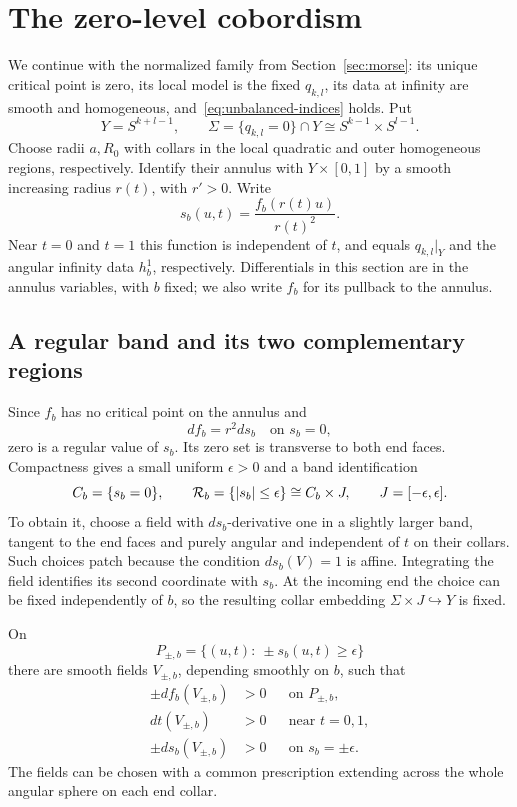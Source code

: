 \section{The zero-level cobordism}\label{sec:obstruction}

We continue with the normalized family from Section~\ref{sec:morse}: its unique critical point is zero, its local model is the fixed $q_{k,l}$, its data at infinity are smooth and homogeneous, and~\eqref{eq:unbalanced-indices} holds. Put
\[
 Y=S^{k+l-1},\qquad
 \Sigma=\{q_{k,l}=0\}\cap Y\cong S^{k-1}\times S^{l-1}.
\]
Choose radii $a,R_0$ with collars in the local quadratic and outer homogeneous regions, respectively. Identify their annulus with $Y\times[0,1]$ by a smooth increasing radius $r(t)$, with $r'>0$. Write
\[
 s_b(u,t)=\frac{f_b(r(t)u)}{r(t)^2}.
\]
Near $t=0$ and $t=1$ this function is independent of $t$, and equals $q_{k,l}|_Y$ and the angular infinity data $h_b^1$, respectively. Differentials in this section are in the annulus variables, with $b$ fixed; we also write $f_b$ for its pullback to the annulus.

\subsection{A regular band and its two complementary regions}

Since $f_b$ has no critical point on the annulus and
\begin{equation}\label{eq:zero-level-differential}
 df_b=r^2ds_b\quad\text{on }s_b=0,
\end{equation}
zero is a regular value of $s_b$. Its zero set is transverse to both end faces. Compactness gives a small uniform $\epsilon>0$ and a band identification
\begin{equation}\label{eq:zero-band}
 C_b=\{s_b=0\},\qquad
 \mathcal R_b=\{\lvert s_b\rvert\leq\epsilon\}\cong C_b\times J,
 \qquad J=[-\epsilon,\epsilon].
\end{equation}
To obtain it, choose a field with $ds_b$-derivative one in a slightly larger band, tangent to the end faces and purely angular and independent of $t$ on their collars. Such choices patch because the condition $ds_b(V)=1$ is affine. Integrating the field identifies its second coordinate with $s_b$. At the incoming end the choice can be fixed independently of $b$, so the resulting collar embedding $\Sigma\times J\hookrightarrow Y$ is fixed.

\begin{lemma}\label{lem:signed-flows}
On
\[
 P_{\pm,b}=\{(u,t):\ \pm s_b(u,t)\geq\epsilon\}
\]
there are smooth fields $V_{\pm,b}$, depending smoothly on $b$, such that
\begin{align}
 \pm df_b(V_{\pm,b})&>0 &&\text{on }P_{\pm,b},\label{eq:field-f}\\
 dt(V_{\pm,b})&>0 &&\text{near }t=0,1,\label{eq:field-t}\\
 \pm ds_b(V_{\pm,b})&>0 &&\text{on }s_b=\pm\epsilon.\label{eq:field-s}
\end{align}
The fields can be chosen with a common prescription extending across the whole angular sphere on each end collar.
\end{lemma}

